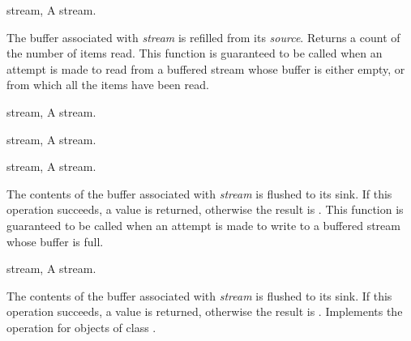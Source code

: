 \begin{optDefinition}
\label{Buffer-management}

\begin{genericargs}
    \item[stream, \classref{buffered-stream}] A stream.
\end{genericargs}
%
\result%
The buffer associated with {\em stream\/} is refilled from its {\em source\/}.
Returns a count of the number of items read.
%
\remarks%
This function is guaranteed to be called when an attempt is made to read from a
buffered stream whose buffer is either empty, or from which all the items have
been read.

\begin{specargs}
    \item[stream, \classref{buffered-stream}] A stream.
\end{specargs}

\begin{specargs}
    \item[stream, \classref{file-stream}] A stream.
\end{specargs}

\begin{genericargs}
    \item[stream, \classref{buffered-stream}] A stream.
\end{genericargs}
%
\result%
The contents of the buffer associated with {\em stream} is flushed to
its sink. If this operation succeeds, a \true{} value is returned, otherwise the
result is \nil{}.
%
\remarks%
This function is guaranteed to be called when an attempt is made to
write to a buffered stream whose buffer is full.

\begin{specargs}
    \item[stream, \classref{buffered-stream}] A stream.
\end{specargs}
%
\result%
The contents of the buffer associated with {\em stream} is flushed to
its sink. If this operation succeeds, a \true{} value is returned, otherwise the
result is \nil{}.
%
\remarks%
Implements the  operation for objects of class
.


\end{optDefinition}
